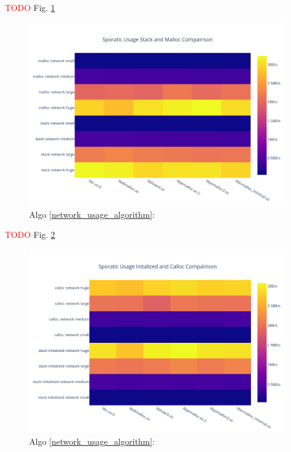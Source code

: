 \documentclass[letterpaper, 10 pt, conference]{ieeeconf}  %
\newcommand*\todo[0]{\textcolor{red}{TODO }}
\begin{document}
\todo Fig. \ref{algo3_stack_malloc_hist}

\begin{figure}[tbh!]
  \centering
  \includegraphics[width=\columnwidth]{graphs/sporatic_stack_malloc_hist.png}
  \caption{ Algo \ref{network_usage_algorithm}: }
  \label{algo3_stack_malloc_hist}
\end{figure}

\todo Fig. \ref{algo3_init_calloc_hist}

\begin{figure}[tbh!]
  \centering
  \includegraphics[width=\columnwidth]{graphs/sporatic_init_calloc_hist.png}
  \caption{ Algo \ref{network_usage_algorithm}: }
  \label{algo3_init_calloc_hist}
\end{figure}
\end{document}
